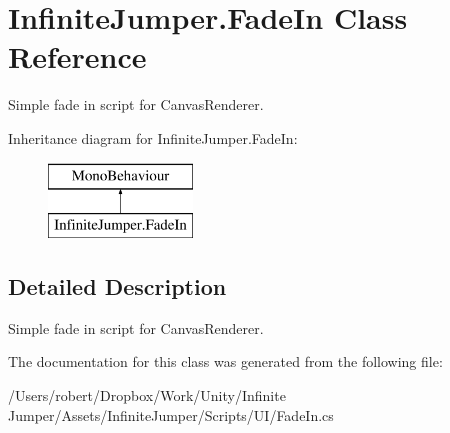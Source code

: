 \hypertarget{class_infinite_jumper_1_1_fade_in}{}\section{Infinite\+Jumper.\+Fade\+In Class Reference}
\label{class_infinite_jumper_1_1_fade_in}


Simple fade in script for Canvas\+Renderer.  


Inheritance diagram for Infinite\+Jumper.\+Fade\+In\+:\begin{figure}[H]
\begin{center}
\leavevmode
\includegraphics[height=2.000000cm]{class_infinite_jumper_1_1_fade_in}
\end{center}
\end{figure}


\subsection{Detailed Description}
Simple fade in script for Canvas\+Renderer. 



The documentation for this class was generated from the following file\+:\begin{DoxyCompactItemize}
\item 
/\+Users/robert/\+Dropbox/\+Work/\+Unity/\+Infinite Jumper/\+Assets/\+Infinite\+Jumper/\+Scripts/\+U\+I/Fade\+In.\+cs\end{DoxyCompactItemize}
